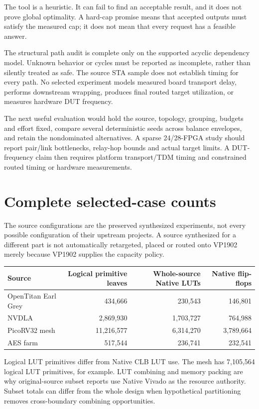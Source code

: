 \documentclass[11pt]{article}
\begin{document}
The tool is a heuristic. It can fail to find an acceptable result, and it does not prove global optimality. A hard-cap promise means that accepted outputs must satisfy the measured cap; it does not mean that every request has a feasible answer.

The structural path audit is complete only on the supported acyclic dependency model. Unknown behavior or cycles must be reported as incomplete, rather than silently treated as safe. The source STA sample does not establish timing for every path. No selected experiment models measured board transport delay, performs downstream wrapping, produces final routed target utilization, or measures hardware DUT frequency.

The next useful evaluation would hold the source, topology, grouping, budgets and effort fixed, compare several deterministic seeds across balance envelopes, and retain the nondominated alternatives. A sparse 24/28-FPGA study should report pair/link bottlenecks, relay-hop bounds and actual target limits. A DUT-frequency claim then requires platform transport/TDM timing and constrained routed timing or hardware measurements.

\appendix
\section{Complete selected-case counts}\label{app:results}

The source configurations are the preserved synthesized experiments, not every possible configuration of their upstream projects. A source synthesized for a different part is not automatically retargeted, placed or routed onto VP1902 merely because VP1902 supplies the capacity policy.

\begin{center}\small
\begin{tabular}{lrrr}
\toprule
Source & Logical primitive leaves & Whole-source Native LUTs & Native flip-flops\\
\midrule
OpenTitan Earl Grey & 434,666 & 230,543 & 146,801\\
NVDLA & 2,869,930 & 1,703,727 & 764,988\\
PicoRV32 mesh & 11,216,577 & 6,314,270 & 3,789,664\\
AES farm & 517,544 & 236,741 & 232,541\\
\bottomrule
\end{tabular}
\end{center}
Logical LUT primitives differ from Native CLB LUT use. The mesh has 7,105,564 logical LUT primitives, for example. LUT combining and memory packing are why original-source subset reports use Native Vivado as the resource authority. Subset totals can differ from the whole design when hypothetical partitioning removes cross-boundary combining opportunities.
\end{document}
